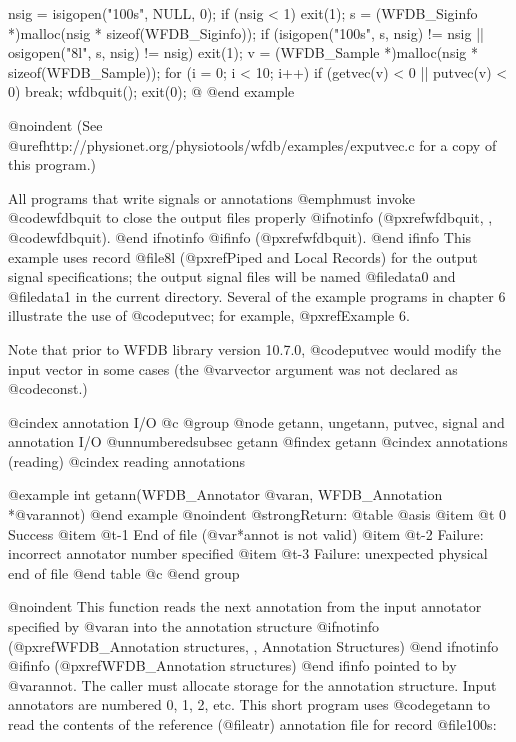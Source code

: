 {{{{{{{{{    nsig = isigopen("100s", NULL, 0);
    if (nsig < 1)
        exit(1);
    s = (WFDB_Siginfo *)malloc(nsig * sizeof(WFDB_Siginfo));
    if (isigopen("100s", s, nsig) != nsig || 
        osigopen("8l", s, nsig) != nsig)
        exit(1);
    v = (WFDB_Sample *)malloc(nsig * sizeof(WFDB_Sample));
    for (i = 0; i < 10; i++)
        if (getvec(v) < 0 || putvec(v) < 0)
            break;
    wfdbquit();
    exit(0);
@}
@end example

@noindent
(See @uref{http://physionet.org/physiotools/wfdb/examples/exputvec.c}
for a copy of this program.)

All programs that write signals or annotations @emph{must} invoke
@code{wfdbquit} to close the output files properly
@ifnotinfo
(@pxref{wfdbquit, , @code{wfdbquit}}).
@end ifnotinfo
@ifinfo
(@pxref{wfdbquit}).
@end ifinfo
This example uses record @file{8l} (@pxref{Piped and Local Records}) for the
output signal specifications; the output signal files will be named
@file{data0} and @file{data1} in the current directory.  Several of the example
programs in chapter 6 illustrate the use of @code{putvec}; for example,
@pxref{Example 6}.

Note that prior to WFDB library version 10.7.0, @code{putvec} would modify the
input vector in some cases (the @var{vector} argument was not declared as
@code{const}.)

@cindex annotation I/O
@c @group
@node     getann, ungetann, putvec, signal and annotation I/O
@unnumberedsubsec getann
@findex getann
@cindex annotations (reading)
@cindex reading annotations

@example
int getann(WFDB_Annotator @var{an}, WFDB_Annotation *@var{annot})
@end example
@noindent
@strong{Return:}
@table @asis
@item @t{ 0}
Success
@item @t{-1}
End of file (@var{*annot} is not valid)
@item @t{-2}
Failure: incorrect annotator number specified
@item @t{-3}
Failure: unexpected physical end of file
@end table
@c @end group

@noindent
This function reads the next annotation from the input annotator
specified by @var{an} into the annotation structure
@ifnotinfo
(@pxref{WFDB_Annotation structures, , Annotation Structures})
@end ifnotinfo
@ifinfo
(@pxref{WFDB_Annotation structures})
@end ifinfo
pointed to by @var{annot}.  The caller must allocate storage for the
annotation structure.  Input annotators are numbered 0, 1, 2, etc.  This
short program uses @code{getann} to read the contents of the reference
(@file{atr}) annotation file for record @file{100s}:

}}}}}}}}
